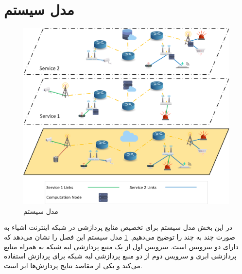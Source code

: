   \section{مدل سیستم}
    \begin{figure}[]
      \centerline{\includegraphics[width=15cm]{graphics/many_to_many/system_model}}
      \caption{مدل سیستم}
      \label{fig:many_to_many:system_model}
    \end{figure}
    در این بخش مدل سیستم برای تخصیص منابع پردازشی در شبکه اینترنت اشیاء به صورت چند به چند را توضیح می‌دهیم.
    \cref{fig:many_to_many:system_model} مدل سیستم این فصل را نشان می‌دهد که دارای دو سرویس است.
    سرویس اول از یک منبع پردازشی لبه شبکه به همراه منابع پردازشی ابری و سرویس دوم از دو منبع پردازشی لبه شبکه برای پردازش استفاده می‌کند و یکی از مقاصد نتایج پردازش‌ها ابر است.

